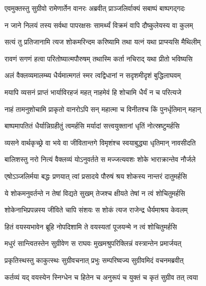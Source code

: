 
\twolineshloka
{एवमुक्तस्तु सुग्रीवो रामेणार्तेन वानरः}
{अब्रवीत् प्राञ्जलिर्वाक्यं सबाष्पं बाष्पगद्गदः} %

\twolineshloka
{न जाने निलयं तस्य सर्वथा पापरक्षसः}
{सामर्थ्यं विक्रमं वापि दौष्कुलेयस्य वा कुलम्} %

\twolineshloka
{सत्यं तु प्रतिजानामि त्यज शोकमरिन्दम}
{करिष्यामि तथा यत्नं यथा प्राप्स्यसि मैथिलीम्} %

\twolineshloka
{रावणं सगणं हत्वा परितोष्यात्मपौरुषम्}
{तथास्मि कर्ता नचिराद् यथा प्रीतो भविष्यसि} %

\twolineshloka
{अलं वैक्लव्यमालम्ब्य धैर्यमात्मगतं स्मर}
{त्वद्विधानां न सदृशमीदृशं बुद्धिलाघवम्} %

\twolineshloka
{मयापि व्यसनं प्राप्तं भार्याविरहजं महत्}
{नाहमेवं हि शोचामि धैर्यं न च परित्यजे} %

\twolineshloka
{नाहं तामनुशोचामि प्राकृतो वानरोऽपि सन्}
{महात्मा च विनीतश्च किं पुनर्धृतिमान् महान्} %

\twolineshloka
{बाष्पमापतितं धैर्यान्निग्रहीतुं त्वमर्हसि}
{मर्यादां सत्त्वयुक्तानां धृतिं नोत्स्रष्टुमर्हसि} %

\twolineshloka
{व्यसने वार्थकृच्छ्रे वा भये वा जीवितान्तगे}
{विमृशंश्च स्वयाबुद्ध्या धृतिमान् नावसीदति} %

\twolineshloka
{बालिशस्तु नरो नित्यं वैक्लव्यं योऽनुवर्तते}
{स मज्जत्यवशः शोके भाराक्रान्तेव नौर्जले} %

\twolineshloka
{एषोऽञ्जलिर्मया बद्धः प्रणयात् त्वां प्रसादये}
{पौरुषं श्रय शोकस्य नान्तरं दातुमर्हसि} %

\twolineshloka
{ये शोकमनुवर्तन्ते न तेषां विद्यते सुखम्}
{तेजश्च क्षीयते तेषां न त्वं शोचितुमर्हसि} %

\twolineshloka
{शोकेनाभिप्रपन्नस्य जीविते चापि संशयः}
{स शोकं त्यज राजेन्द्र धैर्यमाश्रय केवलम्} %

\twolineshloka
{हितं वयस्यभावेन ब्रूहि नोपदिशामि ते}
{वयस्यतां पूजयन्मे न त्वं शोचितुमर्हसि} %

\twolineshloka
{मधुरं सान्त्वितस्तेन सुग्रीवेण स राघवः}
{मुखमश्रुपरिक्लिन्नं वस्त्रान्तेन प्रमार्जयत्} %

\twolineshloka
{प्रकृतिस्थस्तु काकुत्स्थः सुग्रीवचनात् प्रभुः}
{सम्परिष्वज्य सुग्रीवमिदं वचनमब्रवीत्} %

\twolineshloka
{कर्तव्यं यद् वयस्येन स्निग्धेन च हितेन च}
{अनुरूपं च युक्तं च कृतं सुग्रीव तत् त्वया} %

